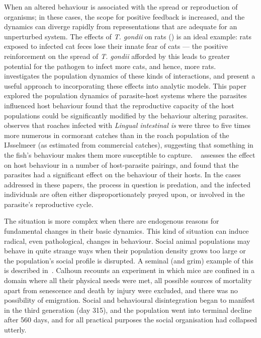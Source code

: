 When an altered behaviour is associated with the spread or
reproduction of organisms; in these cases, the scope for positive
feedback is increased, and the dynamics can diverge rapidly from
representations that are adequate for an unperturbed system.  The
effects of \emph{T. gondii} on rats (\citep{beady2000fatal}) is an
ideal example: rats exposed to infected cat feces lose their innate
fear of cats --- the positive reinforcement on the spread
of \emph{T. gondii} afforded by this leads to greater potential for
the pathogen to infect more cats, and hence, more
rats. ~\citet{dobson1988population} investigates the population
dynamics of these kinds of interactions, and present a useful approach
to incorporating these effects into analytic models. This paper
explored the population dynamics of parasite-host systems where the
parasites influenced host behaviour found that the reproductive
capacity of the host populations could be significantly modified by
the behaviour altering parasites. ~\citep{Dobbin1952food} observes that
roaches infected with \emph{Lingual intestinal is} were three to five
times more numerous in cormorant catches than in the roach population
of the IJsselmeer (as estimated from commercial catches), suggesting
that something in the fish's behaviour makes them more susceptible to
capture. ~\cite{poulin1994meta} assesses the effect on host behaviour
in a number of host-parasite pairings, and found that the parasites
had a significant effect on the behaviour of their hosts.  In the
cases addressed in these papers, the process in question is predation,
and the infected individuals are often either disproportionately
preyed upon, or involved in the parasite's reproductive cycle.

The situation is more complex when there are endogenous reasons for
fundamental changes in their basic dynamics. This kind of situation
can induce radical, even pathological, changes in behaviour.  Social
animal populations may behave in quite strange ways when their
population density grows too large or the population's social profile
is disrupted.  A seminal (and grim) example of this is described
in~\cite{calhoun1973death}. Calhoun recounts an experiment in which
mice are confined in a domain where all their physical needs were met,
all possible sources of mortality apart from senescence and death by
injury were excluded, and there was no possibility of emigration.
Social and behavioural disintegration began to manifest in the third
generation (day 315), and the population went into terminal decline
after 560 days, and for all practical purposes the social organisation
had collapsed utterly.

